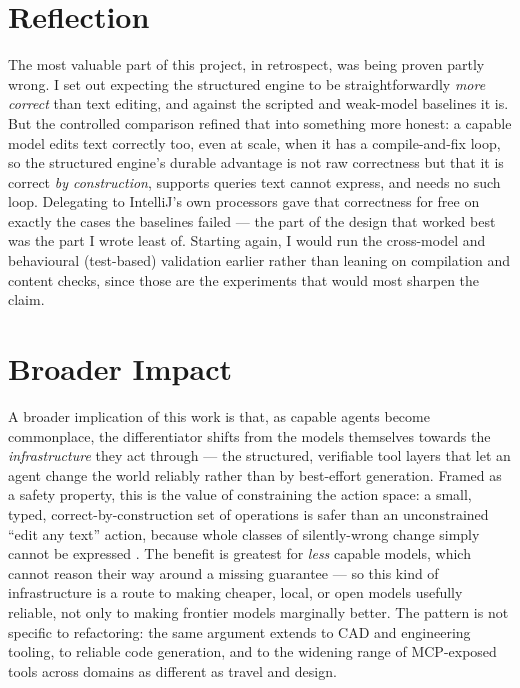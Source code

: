 \section{Reflection}
\label{sec:concl-reflection}
The most valuable part of this project, in retrospect, was being proven partly wrong. I
set out expecting the structured engine to be straightforwardly \emph{more correct} than
text editing, and against the scripted and weak-model baselines it is. But the controlled
comparison refined that into something more honest: a capable model edits text correctly
too, even at scale, when it has a compile-and-fix loop, so the structured engine's
durable advantage is not raw correctness but that it is correct \emph{by construction},
supports queries text cannot express, and needs no such loop. Delegating to IntelliJ's
own processors gave that correctness for free on exactly the cases the baselines failed
--- the part of the design that worked best was the part I wrote least of. Starting
again, I would run the cross-model and behavioural (test-based) validation earlier
rather than leaning on compilation and content checks, since those are the experiments
that would most sharpen the claim.

\section{Broader Impact}
\label{sec:concl-impact}
A broader implication of this work is that, as capable agents become commonplace, the
differentiator shifts from the models themselves towards the \emph{infrastructure} they
act through --- the structured, verifiable tool layers that let an agent change the
world reliably rather than by best-effort generation. Framed as a safety property, this
is the value of constraining the action space: a small, typed, correct-by-construction
set of operations is safer than an unconstrained ``edit any text'' action, because whole
classes of silently-wrong change simply cannot be expressed
\citep{demystifying2025, sweagent2024}. The benefit is greatest for \emph{less} capable
models, which cannot reason their way around a missing guarantee --- so this kind of
infrastructure is a route to making cheaper, local, or open models usefully reliable,
not only to making frontier models marginally better. The pattern is not specific to
refactoring: the same argument extends to CAD and engineering tooling, to reliable code
generation, and to the widening range of MCP-exposed tools across domains as different
as travel and design.

